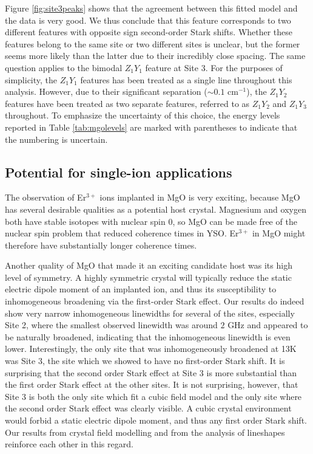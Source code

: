 \documentclass[12pt]{puthesis}
\newcommand{\erbium}[1][ ]{Er$^{3+}$#1}
\newcommand{\wn}{cm$^{-1}$}
\begin{document}
Figure \ref{fig:site3peaks} shows that the agreement between this fitted model and the data is very good. We thus conclude that this feature corresponds to two different features with opposite sign second-order Stark shifts. Whether these features belong to the same site or two different sites is unclear, but the former seems more likely than the latter due to their incredibly close spacing. The same question applies to the bimodal $Z_{1}Y_{1}$ feature at Site 3. For the purposes of simplicity, the $Z_{1}Y_{1}$ features has been treated as a single line throughout this analysis. However, due to their significant separation ($\sim 0.1$ \wn), the $Z_{1}Y_{2}$ features have been treated as two separate features, referred to as $Z_{1}Y_{2}$ and $Z_{1}Y_{3}$ throughout. To emphasize the uncertainty of this choice, the energy levels reported in Table \ref{tab:mgolevels} are marked with parentheses to indicate that the numbering is uncertain.

\subsection{Potential for single-ion applications}
The observation of \erbium ions implanted in MgO is very exciting, because MgO has several desirable qualities as a potential host crystal. Magnesium and oxygen both have stable isotopes with nuclear spin 0, so MgO can be made free of the nuclear spin problem that reduced coherence times in YSO. \erbium in MgO might therefore have substantially longer coherence times.

Another quality of MgO that made it an exciting candidate host was its high level of symmetry. A highly symmetric crystal will typically reduce the static electric dipole moment of an implanted ion, and thus its susceptibility to inhomogeneous broadening via the first-order Stark effect. Our results do indeed show very narrow inhomogeneous linewidths for several of the sites, especially Site 2, where the smallest observed linewidth was around $2$ GHz and appeared to be naturally broadened, indicating that the inhomogeneous linewidth is even lower. Interestingly, the only site that was inhomogeneously broadened at 13K was Site 3, the site which we showed to have no first-order Stark shift. It is surprising that the second order Stark effect at Site 3 is more substantial than the first order Stark effect at the other sites. It is not surprising, however, that Site 3 is both the only site which fit a cubic field model and the only site where the second order Stark effect was clearly visible. A cubic crystal environment would forbid a static electric dipole moment, and thus any first order Stark shift. Our results from crystal field modelling and from the analysis of lineshapes reinforce each other in this regard.
\end{document}
